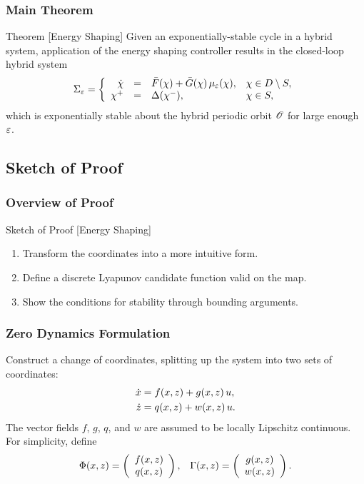 \begin{frame}[t]
  \frametitle{Main Theorem}
  \begin{block}{Theorem [Energy Shaping]}
    Given an exponentially-stable cycle in a hybrid system, application
    of the energy shaping controller results in the closed-loop hybrid system
    \begin{align*}
      \Sigma_{\varepsilon} = \left\{
        \begin{array}{r c l l}
          {\dot {\chi}} &=& {\bar {F}}(\chi) + {\bar {G}}(\chi) \, \mu_{\varepsilon}(\chi), & \chi \in D \setminus S,\\
          \chi^{+} &=& \Delta(\chi^{-}), & \chi \in S,
        \end{array}\right.
    \end{align*}
    which is exponentially stable about the hybrid periodic orbit $\mathscr O$ for
    large enough $\varepsilon$.
  \end{block}
\end{frame}

\subsection{Sketch of Proof}

\begin{frame}[t]
  \frametitle{Overview of Proof}
  \begin{block}{Sketch of Proof [Energy Shaping]}
    \begin{enumerate}
    \item Transform the coordinates into a more intuitive form.
    \item Define a discrete Lyapunov candidate function valid on the \Poincare{} map.
    \item Show the conditions for stability through bounding arguments.
    \end{enumerate}
  \end{block}
\end{frame}

\begin{frame}[t]
  \frametitle{Zero Dynamics Formulation}
  Construct a change of coordinates, splitting up the system into two sets of
  coordinates:
  \begin{align*}
    \dot {x} &= f(x, z) + g(x, z) \, u,\\
    \dot {z} &= q(x, z) + w(x, z) \, u.
  \end{align*}
  The vector fields $f$, $g$, $q$, and $w$ are assumed to be locally Lipschitz
  continuous. For simplicity, define
  \begin{align*}
    \Phi(x, z) = \left(\begin{array}{c}
        f(x, z)\\
        q(x, z)
      \end{array}\right),&&
    \Gamma (x, z) = \left(\begin{array}{c}
        g(x, z)\\
        w(x, z)
      \end{array}\right).
  \end{align*}
\end{frame}


